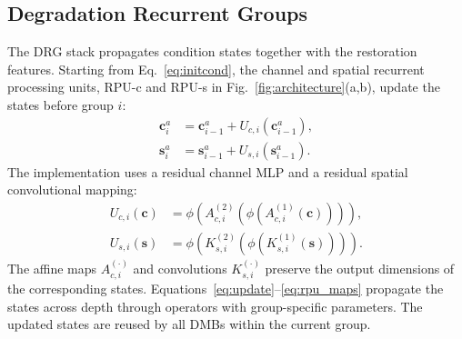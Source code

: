 \documentclass[10pt,journal,letterpaper]{IEEEtran}
\begin{document}
\subsection{Degradation Recurrent Groups}
\label{sec:drg}

The DRG stack propagates condition states together with the restoration features. Starting from Eq.~\eqref{eq:initcond}, the channel and spatial recurrent processing units, RPU-c and RPU-s in Fig.~\ref{fig:architecture}(a,b), update the states before group $i$:
\begin{equation}
\begin{aligned}
\mathbf c_i^a&=\mathbf c_{i-1}^a+U_{c,i}(\mathbf c_{i-1}^a),\\
\mathbf s_i^a&=\mathbf s_{i-1}^a+U_{s,i}(\mathbf s_{i-1}^a).
\end{aligned}
\label{eq:update}
\end{equation}
The implementation uses a residual channel MLP and a residual spatial convolutional mapping:
\begin{equation}
\begin{aligned}
U_{c,i}(\mathbf c)&=\phi\!\left(A_{c,i}^{(2)}(\phi(A_{c,i}^{(1)}(\mathbf c)))\right),\\
U_{s,i}(\mathbf s)&=\phi\!\left(K_{s,i}^{(2)}(\phi(K_{s,i}^{(1)}(\mathbf s)))\right).
\end{aligned}
\label{eq:rpu_maps}
\end{equation}
The affine maps $A_{c,i}^{(\cdot)}$ and convolutions $K_{s,i}^{(\cdot)}$ preserve the output dimensions of the corresponding states. Equations~\eqref{eq:update}--\eqref{eq:rpu_maps} propagate the states across depth through operators with group-specific parameters. The updated states are reused by all DMBs within the current group.
\end{document}
